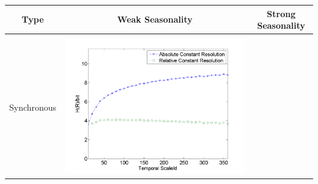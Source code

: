 \documentclass[draft,wrr]{AGUTeX}
\begin{document}
\begin{article}
\begin{table}[H]\small
\resizebox{\textwidth}{!}
{
\label{EN}
\centering
\begin{tabular}{ccc}
\hline
Type& Weak Seasonality & Strong Seasonality \\\hline
\\
Synchronous
&\begin{minipage}{.6\textwidth}\includegraphics[width=\linewidth]{resultgraph/e05585000.png}\end{minipage}


\end{tabular}}
\end{table}
\end{article}
\end{document}
